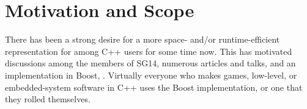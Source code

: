 \section{Motivation and Scope}

There has been a strong desire for a more space- and/or runtime-efficient
representation for  among C++ users for some time now.  This
has motivated discussions among the members of SG14, numerous articles and
talks, and an implementation in Boost, .
Virtually everyone who makes games, low-level, or embedded-system software
in C++ uses the Boost implementation, or one that they rolled themselves.
